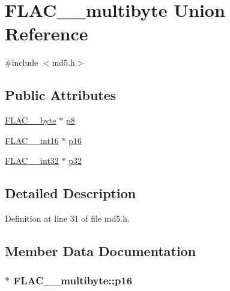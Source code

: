 \hypertarget{union_f_l_a_c____multibyte}{}\section{F\+L\+A\+C\+\_\+\+\_\+multibyte Union Reference}
\label{union_f_l_a_c____multibyte}


{\ttfamily \#include $<$md5.\+h$>$}

\subsection*{Public Attributes}
\begin{DoxyCompactItemize}
\item 
\hyperlink{ordinals_8h_a5eb569b12d5b047cdacada4d57924ee3}{F\+L\+A\+C\+\_\+\+\_\+byte} $\ast$ \hyperlink{union_f_l_a_c____multibyte_a0f2836974ec1451f08c2f3c30c578f16}{p8}
\item 
\hyperlink{ordinals_8h_ae4907c2639411fa7da0fe7a008a5f911}{F\+L\+A\+C\+\_\+\+\_\+int16} $\ast$ \hyperlink{union_f_l_a_c____multibyte_a6c12fa6449994302b8449f129e510706}{p16}
\item 
\hyperlink{ordinals_8h_a33fd77bfe6d685541a0c034a75deccdc}{F\+L\+A\+C\+\_\+\+\_\+int32} $\ast$ \hyperlink{union_f_l_a_c____multibyte_ae369d3df922bc4904c17f9fda0f33053}{p32}
\end{DoxyCompactItemize}


\subsection{Detailed Description}


Definition at line 31 of file md5.\+h.



\subsection{Member Data Documentation}
\subsubsection[{\texorpdfstring{p16}{p16}}]{$\ast$ F\+L\+A\+C\+\_\+\+\_\+multibyte\+::p16}\hypertarget{union_f_l_a_c____multibyte_a6c12fa6449994302b8449f129e510706}{}\label{union_f_l_a_c____multibyte_a6c12fa6449994302b8449f129e510706}


